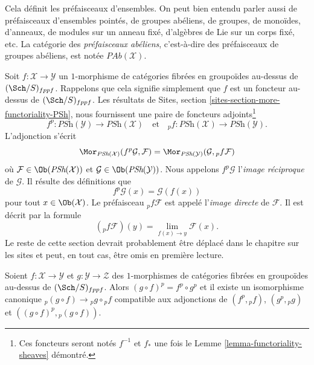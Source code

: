 \noindent
Cela définit les préfaisceaux d'ensembles. On peut bien entendu parler aussi de
préfaisceaux d'ensembles pointés, de groupes abéliens, de groupes, de monoïdes, d'anneaux,
de modules sur un anneau fixé, d'algèbres de Lie sur un corps fixé, etc.
La catégorie des {\it préfaisceaux abéliens}, c'est-à-dire des préfaisceaux de groupes
abéliens, est notée $\textit{PAb}(\mathcal{X})$.

\medskip\noindent
Soit $f : \mathcal{X} \to \mathcal{Y}$ un $1$-morphisme de catégories
fibrées en groupoïdes au-dessus de $(\Sch/S)_{fppf}$. Rappelons que cela
signifie simplement que $f$ est un foncteur au-dessus de $(\Sch/S)_{fppf}$.
Les résultats de
Sites, section \ref{sites-section-more-functoriality-PSh},
nous fournissent une paire de foncteurs adjoints\footnote{Ces foncteurs
seront notés $f^{-1}$ et $f_*$ une fois le
Lemme \ref{lemma-functoriality-sheaves}
démontré.}
\begin{equation}
\label{equation-pushforward-pullback}
f^p : \textit{PSh}(\mathcal{Y}) \longrightarrow \textit{PSh}(\mathcal{X})
\quad\text{et}\quad
{}_pf : \textit{PSh}(\mathcal{X}) \longrightarrow \textit{PSh}(\mathcal{Y}).
\end{equation}
L'adjonction s'écrit
$$
\Mor_{\textit{PSh}(\mathcal{X})}(f^p\mathcal{G}, \mathcal{F})
=
\Mor_{\textit{PSh}(\mathcal{Y})}(\mathcal{G}, {}_pf\mathcal{F})
$$
où $\mathcal{F} \in \Ob(\textit{PSh}(\mathcal{X}))$ et
$\mathcal{G} \in \Ob(\textit{PSh}(\mathcal{Y}))$. Nous appelons
$f^p\mathcal{G}$ l'{\it image réciproque} de $\mathcal{G}$. Il résulte
des définitions que
$$
f^p\mathcal{G}(x) = \mathcal{G}(f(x))
$$
pour tout $x \in \Ob(\mathcal{X})$. Le préfaisceau ${}_pf\mathcal{F}$
est appelé l'{\it image directe} de $\mathcal{F}$. Il est décrit
par la formule
$$
({}_pf\mathcal{F})(y) = \lim_{f(x) \to y} \mathcal{F}(x).
$$
Le reste de cette section devrait probablement être déplacé dans le chapitre
sur les sites et peut, en tout cas, être omis en première lecture.

\begin{lemma}
\label{lemma-1-morphisms-presheaves}
Soient $f : \mathcal{X} \to \mathcal{Y}$ et $g : \mathcal{Y} \to \mathcal{Z}$
des $1$-morphismes de catégories fibrées en groupoïdes au-dessus de
$(\Sch/S)_{fppf}$. Alors $(g \circ f)^p = f^p \circ g^p$ et
il existe un isomorphisme canonique
${}_p(g \circ f) \to {}_pg \circ {}_pf$
compatible aux adjonctions de $(f^p, {}_pf)$, $(g^p, {}_pg)$ et
$((g \circ f)^p, {}_p(g \circ f))$.
\end{lemma}

